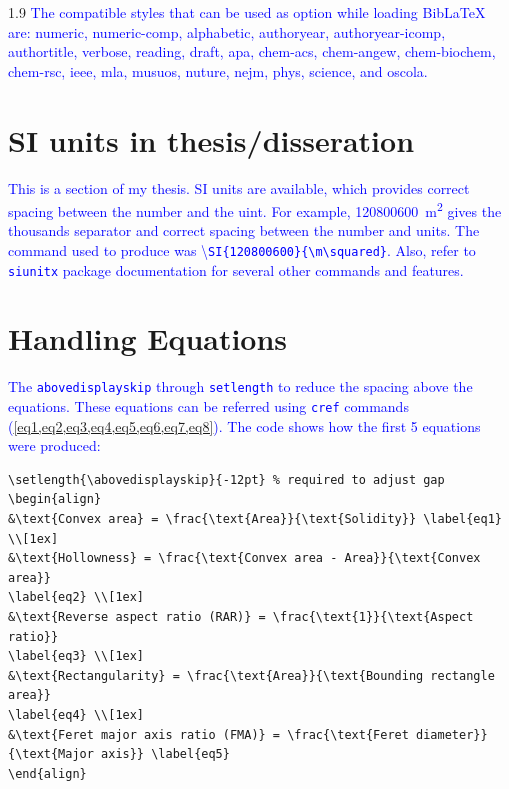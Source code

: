 \documentclass[phd]{ndsu-thesis-2022}
\newcommand\myspacing{1.9}      %
\newcommand\italk[1]{\textcolor{blue}{#1}}  %
\begin{document}
\begin{spacing}{\myspacing}
\italk{The compatible styles that can be used as option while loading Bib\LaTeX\/ are: \textbullet\:numeric, \textbullet\:numeric-comp, \textbullet\:alphabetic, \textbullet\:authoryear, \textbullet\:authoryear-icomp, \textbullet\:authortitle, \textbullet\:verbose, \textbullet\:reading, \textbullet\:draft, \textbullet\:apa, \textbullet\:chem-acs, \textbullet\:chem-angew, \textbullet\:chem-biochem, \textbullet\:chem-rsc, \textbullet\:ieee, \textbullet\:mla, \textbullet\:musuos, \textbullet\:nuture, \textbullet\:nejm, \textbullet\:phys, \textbullet\:science, and \textbullet\:oscola.}



\section{SI units in thesis/disseration}
\italk{This is a section of my thesis. SI units are available, which provides correct spacing between the number and the uint. For example, \SI{120800600}{\m\squared} gives the thousands separator and correct spacing between the number and units. The command used to produce was \textbackslash\texttt{SI\{120800600\}\{\textbackslash m\textbackslash squared\}}.  Also, refer to \texttt{siunitx} package documentation for several other commands and features.} 

\section{Handling Equations}
\italk{The \texttt{abovedisplayskip} through \texttt{setlength} to reduce the spacing above the equations. These equations can be referred using \texttt{cref} commands (\cref{eq1,eq2,eq3,eq4,eq5,eq6,eq7,eq8}). The code shows how the first 5 equations were produced:}

\vspace{3ex}
{\onehalfspacing
\begin{verbatim}
\setlength{\abovedisplayskip}{-12pt} % required to adjust gap 
\begin{align}
&\text{Convex area} = \frac{\text{Area}}{\text{Solidity}} \label{eq1} \\[1ex]
&\text{Hollowness} = \frac{\text{Convex area - Area}}{\text{Convex area}} 
\label{eq2} \\[1ex]
&\text{Reverse aspect ratio (RAR)} = \frac{\text{1}}{\text{Aspect ratio}} 
\label{eq3} \\[1ex]
&\text{Rectangularity} = \frac{\text{Area}}{\text{Bounding rectangle area}}
\label{eq4} \\[1ex]
&\text{Feret major axis ratio (FMA)} = \frac{\text{Feret diameter}}
{\text{Major axis}} \label{eq5} 
\end{align}
\end{verbatim}
}


\end{spacing}
\end{document}
